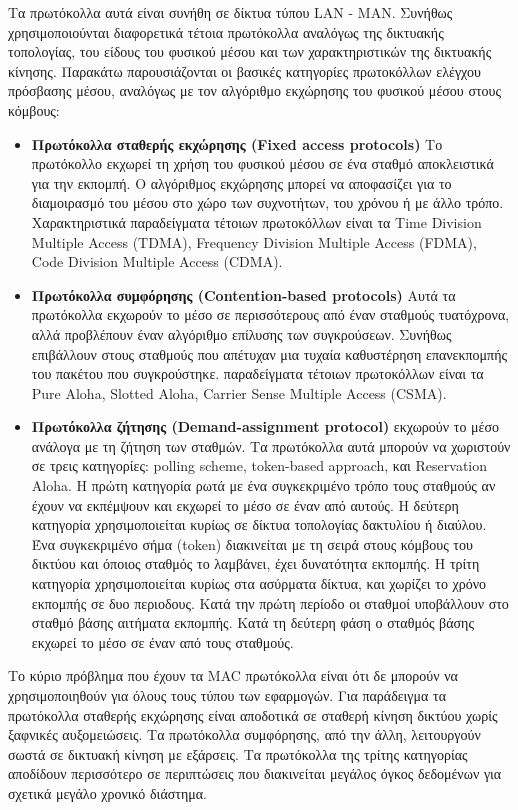 \documentclass[12pt]{report}
\begin{document}
Τα πρωτόκολλα αυτά είναι συνήθη σε δίκτυα τύπου \textlatin{LAN - MAN}. Συνήθως χρησιμοποιούνται διαφορετικά τέτοια πρωτόκολλα αναλόγως της δικτυακής τοπολογίας, του είδους του φυσικού μέσου και των χαρακτηριστικών της δικτυακής κίνησης. Παρακάτω παρουσιάζονται οι βασικές κατηγορίες πρωτοκόλλων ελέγχου πρόσβασης μέσου, αναλόγως με τον αλγόριθμο εκχώρησης του φυσικού μέσου στους κόμβους:
\begin{itemize}
  \item \textbf{Πρωτόκολλα σταθερής εκχώρησης (\textlatin{Fixed access protocols})} Το πρωτόκολλο εκχωρεί τη χρήση του φυσικού μέσου σε ένα σταθμό αποκλειστικά για την εκπομπή. Ο αλγόριθμος εκχώρησης μπορεί να αποφασίζει για το διαμοιρασμό του μέσου στο χώρο των συχνοτήτων, του χρόνου ή με άλλο τρόπο. Χαρακτηριστικά παραδείγματα τέτοιων πρωτοκόλλων είναι τα \textlatin{Time Division Multiple Access (TDMA), Frequency Division Multiple Access (FDMA), Code Division Multiple Access (CDMA)}.
  \item \textbf{Πρωτόκολλα συμφόρησης (\textlatin{Contention-based protocols})} Αυτά τα πρωτόκολλα εκχωρούν το μέσο σε περισσότερους από έναν σταθμούς τυατόχρονα, αλλά προβλέπουν έναν αλγόριθμο επίλυσης των συγκρούσεων. Συνήθως επιβάλλουν στους σταθμούς που απέτυχαν μια τυχαία καθυστέρηση επανεκπομπής του πακέτου που συγκρούστηκε. παραδείγματα τέτοιων πρωτοκόλλων είναι τα \textlatin{Pure Aloha, Slotted Aloha, Carrier Sense Multiple Access (CSMA)}.
  \item \textbf{Πρωτόκολλα ζήτησης (\textlatin{Demand-assignment protocol})} εκχωρούν το μέσο ανάλογα με τη ζήτηση των σταθμών. Τα πρωτόκολλα αυτά μπορούν να χωριστούν σε τρεις κατηγορίες: \textlatin{polling scheme, token-based approach}, και \textlatin{Reservation Aloha}. Η πρώτη κατηγορία ρωτά με ένα συγκεκριμένο τρόπο τους σταθμούς αν έχουν να εκπέμψουν και εκχωρεί το μέσο σε έναν από αυτούς. Η δεύτερη κατηγορία χρησιμοποιείται κυρίως σε δίκτυα τοπολογίας δακτυλίου ή διαύλου. Ένα συγκεκριμένο σήμα (\textlatin{token}) διακινείται με τη σειρά στους κόμβους του δικτύου και όποιος σταθμός το λαμβάνει, έχει δυνατότητα εκπομπής. Η τρίτη κατηγορία χρησιμοποιείται κυρίως στα ασύρματα δίκτυα, και χωρίζει το χρόνο εκπομπής σε δυο περιοδους. Κατά την πρώτη περίοδο οι σταθμοί υποβάλλουν στο σταθμό βάσης αιτήματα εκπομπής. Κατά τη δεύτερη φάση ο σταθμός βάσης εκχωρεί το μέσο σε έναν από τους σταθμούς.
\end{itemize}

Το κύριο πρόβλημα που έχουν τα \textlatin{MAC} πρωτόκολλα είναι ότι δε μπορούν να χρησιμοποιηθούν για όλους τους τύπου των εφαρμογών. Για παράδειγμα τα πρωτόκολλα σταθερής εκχώρησης είναι αποδοτικά σε σταθερή κίνηση δικτύου χωρίς ξαφνικές αυξομειώσεις. Τα πρωτόκολλα συμφόρησης, από την άλλη, λειτουργούν σωστά σε δικτυακή κίνηση με εξάρσεις. Τα πρωτόκολλα της τρίτης κατηγορίας αποδίδουν περισσότερο σε περιπτώσεις που διακινείται μεγάλος όγκος δεδομένων για σχετικά μεγάλο χρονικό διάστημα.
\end{document}

